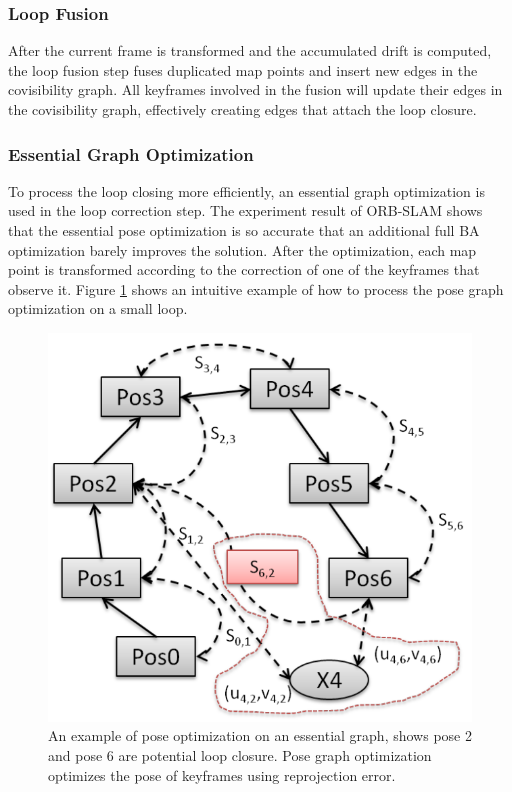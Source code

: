 \documentclass[letterpaper, 10 pt, conference]{ieeeconf}  %
\begin{document}
\subsubsection{Loop Fusion}
After the current frame is transformed and the accumulated drift is computed, the loop fusion step fuses duplicated map points and insert new edges in the covisibility graph. All keyframes involved in the fusion will update their edges in the covisibility graph, effectively creating edges that attach the loop closure.

\subsubsection{Essential Graph Optimization}
To process the loop closing more efficiently, an essential graph optimization is used in the loop correction step. The experiment result of ORB-SLAM shows that the essential pose optimization is so accurate that an additional full BA optimization barely improves the solution. After the optimization, each map point is transformed according to the correction of one of the keyframes that observe it. Figure \ref{pose_optimization} shows an intuitive example of how to process the pose graph optimization on a small loop.

%
\begin{figure}[!htbp]%
\centering
\includegraphics[scale=0.23]{./images/pose_optimization}
\caption{An example of pose optimization on an essential graph, shows pose 2 and pose 6 are potential loop closure. Pose graph optimization optimizes the pose of keyframes using reprojection error.}
\label{pose_optimization}
\end{figure}
%
\end{document}
